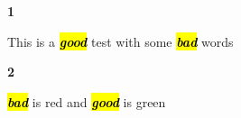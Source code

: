 \textbf{1} \par
This is a \textcolor[rgb]{1,0,0}{\hl{\textbf{\textit{good}}}} test with some \textcolor[rgb]{0,1,0}{\hl{\textbf{\textit{bad}}}} words
\par
\textbf{2} \par
\textcolor[rgb]{0,1,0}{\hl{\textbf{\textit{bad}}}} is red and \textcolor[rgb]{1,0,0}{\hl{\textbf{\textit{good}}}} is green
\par
